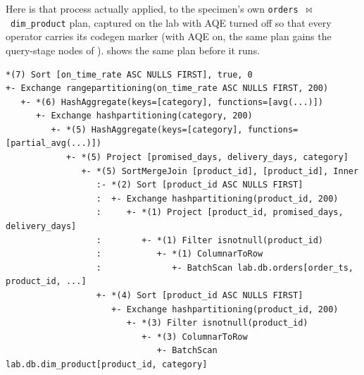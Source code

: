 Here is that process actually applied, to the specimen's own
\texttt{orders}~$\bowtie$~\texttt{dim\_product} plan, captured on the lab with AQE
turned off so that every operator carries its codegen marker (with AQE on, the
same plan gains the query-stage nodes of ). 
shows the same plan before it runs.

\begin{lstlisting}[language=text,numbers=none,style=plan,caption={The specimen's physical plan with AQE off (\texttt{EXPLAIN}, trimmed)},captionpos=b,label=lst:c-specimen-plan]
*(7) Sort [on_time_rate ASC NULLS FIRST], true, 0
+- Exchange rangepartitioning(on_time_rate ASC NULLS FIRST, 200)
   +- *(6) HashAggregate(keys=[category], functions=[avg(...)])
      +- Exchange hashpartitioning(category, 200)
         +- *(5) HashAggregate(keys=[category], functions=[partial_avg(...)])
            +- *(5) Project [promised_days, delivery_days, category]
               +- *(5) SortMergeJoin [product_id], [product_id], Inner
                  :- *(2) Sort [product_id ASC NULLS FIRST]
                  :  +- Exchange hashpartitioning(product_id, 200)
                  :     +- *(1) Project [product_id, promised_days, delivery_days]
                  :        +- *(1) Filter isnotnull(product_id)
                  :           +- *(1) ColumnarToRow
                  :              +- BatchScan lab.db.orders[order_ts, product_id, ...]
                  +- *(4) Sort [product_id ASC NULLS FIRST]
                     +- Exchange hashpartitioning(product_id, 200)
                        +- *(3) Filter isnotnull(product_id)
                           +- *(3) ColumnarToRow
                              +- BatchScan lab.db.dim_product[product_id, category]
\end{lstlisting}

